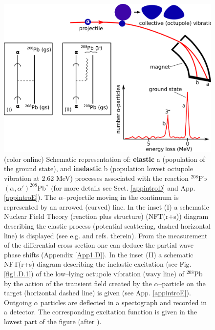 \begin{figure}
\centerline {
\includegraphics*[width=15cm]{introduccion/figs/figintro1}
}
\caption{(color online) Schematic representation of:  \textbf{elastic} a (population of the ground state), and \textbf{inelastic} b (population lowest octupole vibration at 2.62 MeV) processes associated with the reaction $^{208}$Pb$(\alpha,\alpha')^{208}$Pb$^*$ (for more details see Sect. \ref{appintroD} and App. \ref{appintroE}). The $\alpha$--projectile moving in the continuum is represented by an arrowed (curved) line. In the inset (I) a schematic Nuclear Field Theory (reaction plus structure) (NFT(r+s)) diagram describing  the elastic process (potential scattering, dashed horizontal line) is displayed (see e.g. \cite{Broglia:16} and refs. therein). From the measurement of the differential cross section one can deduce the partial wave phase shifts (Appendix \ref{App1.D}). In the inset (II) a schematic NFT(r+s) diagram describing the inelastic  excitation (see Fig. \ref{fig1.D.1}) of the low--lying octupole vibration (wavy line) of $^{208}$Pb by the action of the transient field created by the $\alpha$--particle on the target (horizontal dashed line) is given (see App. \ref{appintroE}).  Outgoing $\alpha$ particles are deflected in a spectograph and recorded in a detector. The corresponding excitation function is given in the lowest part of the figure (after \cite{Mottelson:76b}).}
\label{figintro1}
\end{figure}
